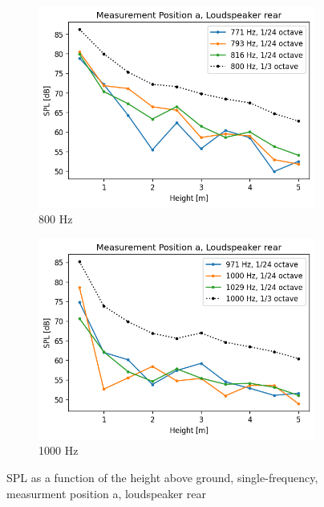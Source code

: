 \begin{figure}[H]
    \centering
     \begin{subfigure}[b]{0.6\textwidth}
        \centering
        \includegraphics[width=\linewidth]{fig/pressure_over_height_800Hz.png}
        \caption{800 Hz}
        \label{fig:SPLoverheight_frequency_800Hz}
    \end{subfigure}

    \begin{subfigure}[b]{0.6\textwidth}
        \centering
        \includegraphics[width=\linewidth]{fig/pressure_over_height_1000Hz.png}
        \caption{1000 Hz}
        \label{fig:SPLoverheight_frequency_1000Hz}
    \end{subfigure}
    \caption{SPL as a function of the height above ground, single-frequency, measurment position a, loudspeaker rear}
    \label{fig:SPLoverheight_frequency}
\end{figure}

